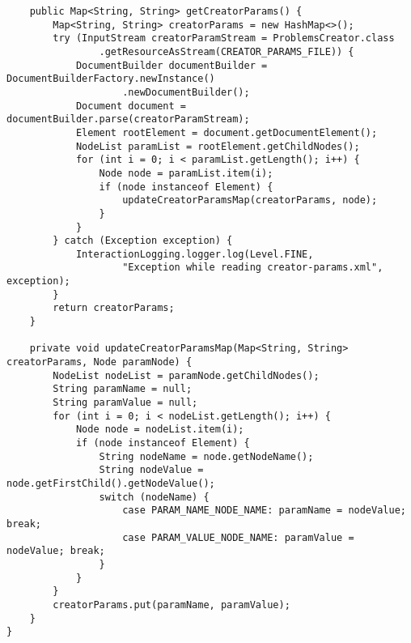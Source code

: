 \begin{verbatim}
    public Map<String, String> getCreatorParams() {
        Map<String, String> creatorParams = new HashMap<>();
        try (InputStream creatorParamStream = ProblemsCreator.class
                .getResourceAsStream(CREATOR_PARAMS_FILE)) {
            DocumentBuilder documentBuilder = DocumentBuilderFactory.newInstance()
                    .newDocumentBuilder();
            Document document = documentBuilder.parse(creatorParamStream);
            Element rootElement = document.getDocumentElement();
            NodeList paramList = rootElement.getChildNodes();
            for (int i = 0; i < paramList.getLength(); i++) {
                Node node = paramList.item(i);
                if (node instanceof Element) {
                    updateCreatorParamsMap(creatorParams, node);
                }
            }
        } catch (Exception exception) {
            InteractionLogging.logger.log(Level.FINE,
                    "Exception while reading creator-params.xml", exception);
        }
        return creatorParams;
    }

    private void updateCreatorParamsMap(Map<String, String> creatorParams, Node paramNode) {
        NodeList nodeList = paramNode.getChildNodes();
        String paramName = null;
        String paramValue = null;
        for (int i = 0; i < nodeList.getLength(); i++) {
            Node node = nodeList.item(i);
            if (node instanceof Element) {
                String nodeName = node.getNodeName();
                String nodeValue = node.getFirstChild().getNodeValue();
                switch (nodeName) {
                    case PARAM_NAME_NODE_NAME: paramName = nodeValue; break;
                    case PARAM_VALUE_NODE_NAME: paramValue = nodeValue; break;
                }
            }
        }
        creatorParams.put(paramName, paramValue);
    }
}
\end{verbatim}